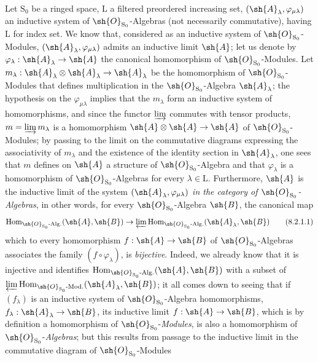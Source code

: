 \begin{env}[8.2.1]
\label{IV.8.2.1}
Let $\mathrm{S}_0$ be a ringed space, $\mathrm{L}$ a filtered preordered increasing set, $(\sh{A}_\lambda,\varphi_{\mu\lambda})$ an inductive system of $\sh{O}_{\mathrm{S}_0}$-Algebras (not necessarily commutative), having $\mathrm{L}$ for index set.
We know that, considered as an inductive system of $\sh{O}_{\mathrm{S}_0}$-Modules, $(\sh{A}_\lambda,\varphi_{\mu\lambda})$ admits an inductive limit $\sh{A}$; let us denote by $\varphi_\lambda:\sh{A}_\lambda\to\sh{A}$ the canonical homomorphism of $\sh{O}_{\mathrm{S}_0}$-Modules.
Let $m_\lambda:\sh{A}_\lambda\otimes\sh{A}_\lambda\to\sh{A}_\lambda$ be the homomorphism of $\sh{O}_{\mathrm{S}_0}$-Modules that defines multiplication in the $\sh{O}_{\mathrm{S}_0}$-Algebra $\sh{A}_\lambda$; the hypothesis on the $\varphi_{\mu\lambda}$ implies that the $m_\lambda$ form an inductive system of homomorphisms,
and since the functor $\varinjlim$ commutes with tensor products, $m=\varinjlim m_\lambda$ is a homomorphism $\sh{A}\otimes\sh{A}\to\sh{A}$ of $\sh{O}_{\mathrm{S}_0}$-Modules; by passing to the limit on the commutative diagrams expressing the associativity of $m_\lambda$ and the existence of the identity section in $\sh{A}_\lambda$, one sees that $m$ defines on $\sh{A}$ a structure of $\sh{O}_{\mathrm{S}_0}$-Algebra and that $\varphi_\lambda$ is a homomorphism of $\sh{O}_{\mathrm{S}_0}$-Algebras for every $\lambda\in\mathrm{L}$.
Furthermore, $\sh{A}$ is the inductive limit of the system $(\sh{A}_\lambda,\varphi_{\mu\lambda})$ \emph{in the category of $\sh{O}_{\mathrm{S}_0}$-Algebras}, in other words, for every $\sh{O}_{\mathrm{S}_0}$-Algebra $\sh{B}$, the canonical map
\begin{equation}
  \operatorname{Hom}_{\sh{O}_{\mathrm{S}_0}\text{-}\mathrm{Alg.}}(\sh{A},\sh{B})\to\varprojlim\operatorname{Hom}_{\sh{O}_{\mathrm{S}_0}\text{-}\mathrm{Alg.}}(\sh{A}_\lambda,\sh{B})
  \tag{8.2.1.1}
\end{equation}
which to every homomorphism $f:\sh{A}\to\sh{B}$ of $\sh{O}_{\mathrm{S}_0}$-Algebras associates the family $(f\circ\varphi_\lambda)$, is \emph{bijective}.
Indeed, we already know that it is injective and identifies $\operatorname{Hom}_{\sh{O}_{\mathrm{S}_0}\text{-}\mathrm{Alg.}}(\sh{A},\sh{B})$ with a subset of $\varprojlim\operatorname{Hom}_{\sh{O}_{\mathrm{S}_0}\text{-}\mathrm{Mod.}}(\sh{A}_\lambda,\sh{B})$; it all comes down to seeing that if $(f_\lambda)$ is an inductive system of $\sh{O}_{\mathrm{S}_0}$-Algebra homomorphisms, $f_\lambda:\sh{A}_\lambda\to\sh{B}$, its inductive limit $f:\sh{A}\to\sh{B}$, which is by definition a homomorphism of $\sh{O}_{\mathrm{S}_0}$-\emph{Modules}, is also a homomorphism of $\sh{O}_{\mathrm{S}_0}$-\emph{Algebras}; but this results from passage to the inductive limit in the commutative diagram of $\sh{O}_{\mathrm{S}_0}$-Modules

\end{env}
